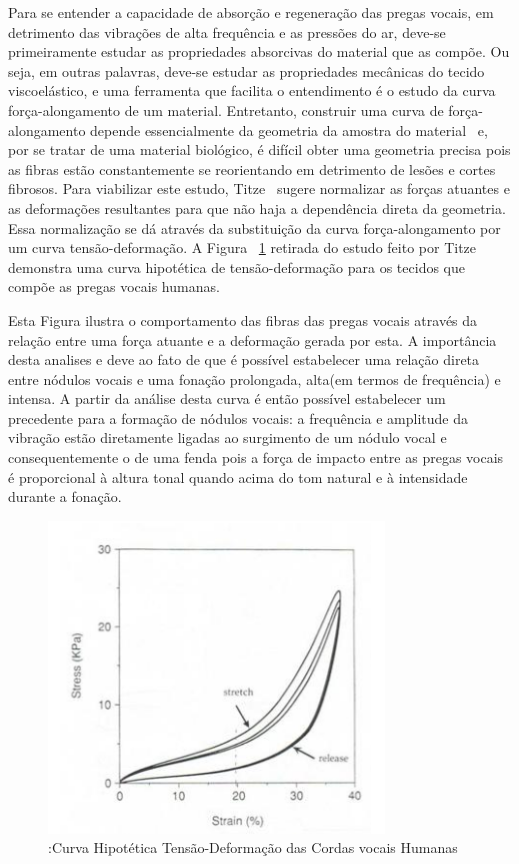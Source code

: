 	Para se entender a capacidade de absorção e regeneração das pregas vocais, em detrimento das vibrações de alta frequência e as pressões do ar, deve-se primeiramente estudar as propriedades absorcivas do material que as compõe. Ou seja, em outras palavras, deve-se estudar as propriedades mecânicas do tecido viscoelástico, e uma ferramenta que facilita o entendimento é o estudo da curva força-alongamento de um material. Entretanto, construir uma curva de força-alongamento depende essencialmente da geometria da amostra do material~\cite{IngoTitze} e, por se tratar de uma material biológico, é difícil obter uma geometria precisa pois as ﬁbras estão constantemente se reorientando em detrimento de lesões e cortes ﬁbrosos. Para viabilizar este estudo, Titze~\cite{IngoTitze} sugere normalizar as forças atuantes e as deformações resultantes para que não haja a dependência direta da geometria. Essa normalização se dá através da substituição da curva força-alongamento por um curva tensão-deformação. A Figura ~\ref{fig:curvaTensao} retirada do estudo feito por Titze ~\cite{IngoTitze} demonstra uma curva hipotética de tensão-deformação para os tecidos que compõe as pregas vocais humanas. 
	
	Esta Figura ilustra o comportamento das ﬁbras das pregas vocais através da relação entre uma força atuante e a deformação gerada por esta.
	 A importância desta analises e deve ao fato de que é possível estabelecer uma relação direta entre nódulos vocais e uma fonação prolongada, alta(em termos de frequência) e intensa. A partir da análise desta curva é então possível estabelecer um precedente para a formação de nódulos vocais: a frequência e amplitude da vibração estão diretamente ligadas ao surgimento de um nódulo vocal e consequentemente o de uma fenda pois a força de impacto entre as pregas vocais é proporcional à altura tonal quando acima do tom natural e à intensidade durante a fonação.
	
	\begin{figure}
		\centering		
		\includegraphics{figura1.png}
		\caption{:Curva Hipotética Tensão-Deformação das Cordas vocais Humanas~\cite{IngoTitze}}
		\label{fig:curvaTensao}
	\end{figure}
	
	
